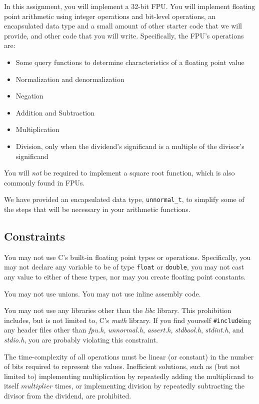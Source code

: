 In this assignment, you will implement a 32-bit FPU\@.
You will implement floating point arithmetic using integer operations and bit-level operations, an encapsulated data type and a small amount of other starter code that we will provide, and other code that you will write.
Specifically, the FPU's operations are:
\begin{itemize}
    \item Some query functions to determine characteristics of a floating point value
    \item Normalization and denormalization
    \item Negation
    \item Addition and Subtraction
    \item Multiplication
    \item Division, only when the dividend's significand is a multiple of the divisor's significand
\end{itemize}
You will \textit{not} be required to implement a square root function, which is also commonly found in FPUs.

We have provided an encapsulated data type, \lstinline{unnormal_t}, to simplify some of the steps that will be necessary in your arithmetic functions.

\subsection{Constraints}

You may not use C's built-in floating point types or operations.
Specifically, you may not declare any variable to be of type \lstinline{float} or \lstinline{double}, you may not cast any value to either of these types, nor may you create floating point constants.

You may not use unions.
You may not use inline assembly code.

You may not use any libraries other than the \textit{libc} library.
This prohibition includes, but is not limited to, C's \textit{math} library.
If you find yourself \lstinline{#include}ing any header files other than \textit{fpu.h}, \textit{unnormal.h}, \textit{assert.h}, \textit{stdbool.h}, \textit{stdint.h}, and \textit{stdio.h}, you are probably violating this constraint.

The time-complexity of all operations must be linear (or constant) in the number of bits required to represent the values.
Inefficient solutions, such as (but not limited to) implementing multiplication by repeatedly adding the multiplicand to itself $multiplier$ times, or implementing division by repeatedly subtracting the divisor from the dividend, are prohibited.

